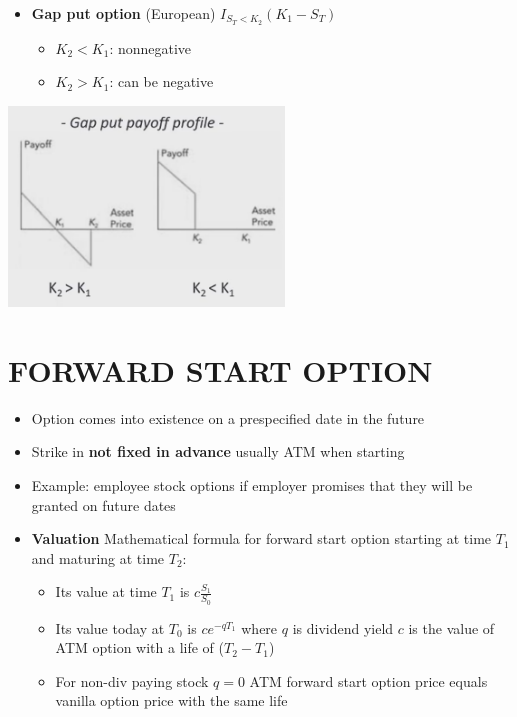 \documentclass{article}
\begin{document}
\begin{itemize}
    \item {\bf Gap put option} (European) $I_{S_T < K_2} ( K_1 - S_T)$
    \begin{itemize}
        \item $K_2 < K_1$: nonnegative
        \item $K_2 > K_1$: can be negative
    \end{itemize}
\end{itemize}


\includegraphics[width=0.55\textwidth]{Gap_put_payoff_profile.png}



\newpage
\section{FORWARD START OPTION}
\begin{itemize}
    \item Option comes into existence on a prespecified date in the future
    \item Strike in {\bf not fixed in advance} usually ATM when starting
    \item Example: employee stock options if employer promises that they will be granted on future dates
    \item {\bf Valuation} Mathematical formula for forward start option starting at time $T_1$ and maturing at time $T_2$:
    \begin{itemize}
        \item Its value at time $T_1$ is $c \frac{S_1}{S_0}$
        \item Its value today at $T_0$ is $c e^{-q T_1}$ where $q$ is dividend yield $c$ is the value of ATM option with a life of ($T_2 - T_1$)
        \item For non-div paying stock $q = 0$ ATM forward start option price equals vanilla option price with the same life
    \end{itemize}
\end{itemize}
\end{document}
